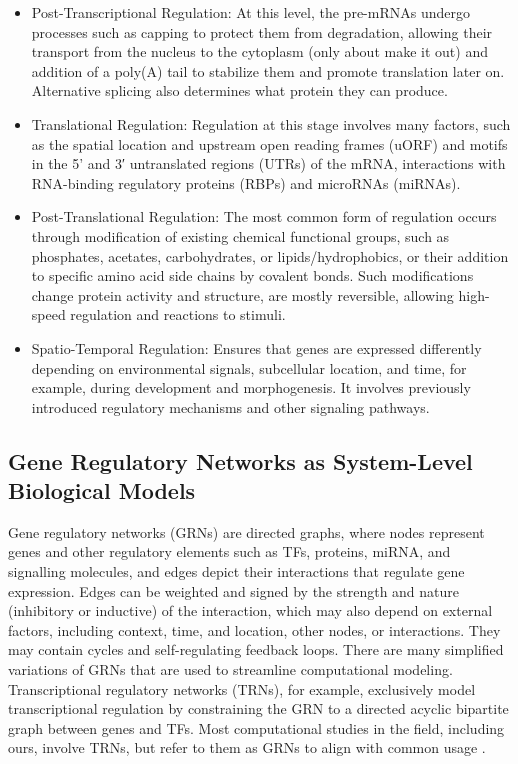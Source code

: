 \begin{itemize}
\item Post-Transcriptional Regulation: At this level, the pre-mRNAs undergo processes such as capping to protect them from degradation, allowing their transport from the nucleus to the cytoplasm (only about  make it out) and addition of a poly(A) tail to stabilize them and promote translation later on. Alternative splicing also determines what protein they can produce. 
\item Translational Regulation: Regulation at this stage involves many factors, such as the spatial location and upstream open reading frames (uORF) and motifs in the 5’ and 3′ untranslated regions (UTRs) of the mRNA, interactions with RNA-binding regulatory proteins (RBPs) and microRNAs (miRNAs). 
\item Post-Translational Regulation: The most common form of regulation occurs through modification of existing chemical functional groups, such as phosphates, acetates, carbohydrates, or lipids/hydrophobics, or their addition to specific amino acid side chains by covalent bonds. Such modifications change protein activity and structure, are mostly reversible, allowing high-speed regulation and reactions to stimuli.
\item Spatio-Temporal Regulation: Ensures that genes are expressed differently depending on environmental signals, subcellular location, and time, for example, during development and morphogenesis. It involves previously introduced regulatory mechanisms and other signaling pathways.

\end{itemize}


\subsection*{Gene Regulatory Networks as System-Level Biological Models}
Gene regulatory networks (GRNs) \cite{davidson2005gene} are directed graphs, where nodes represent genes and other regulatory elements such as TFs, proteins, miRNA, and signalling molecules, and edges depict their interactions that regulate gene expression. Edges can be weighted and signed by the strength and nature (inhibitory or inductive) of the interaction, which may also depend on external factors, including context, time, and location, other nodes, or interactions. They may contain cycles and self-regulating feedback loops. There are many simplified variations of  GRNs that are used to streamline computational modeling. Transcriptional regulatory networks (TRNs), for example, exclusively model transcriptional regulation by constraining the GRN to a directed acyclic bipartite graph between genes and TFs. Most computational studies in the field, including ours, involve TRNs, but refer to them as GRNs to align with common usage \cite{karamveer2024approaches}. 

